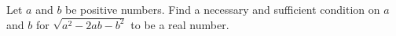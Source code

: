 Let $a$ and $b$ be positive numbers. Find a necessary and sufficient condition on $a$ and $b$ for $\sqrt{a^2-2ab-b^2}$ to be a real number.
